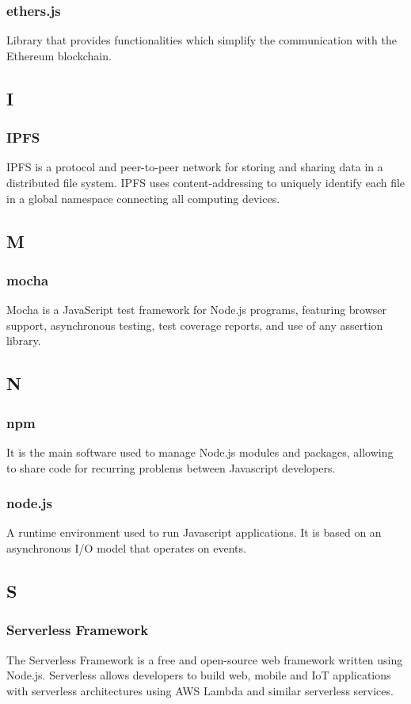 		\subsubsection*{ethers.js}
			Library that provides functionalities which simplify the communication with the Ethereum blockchain.
	
	\subsection{I}
		\subsubsection*{IPFS}
			IPFS is a protocol and peer-to-peer network for storing and sharing data in a distributed file system. IPFS uses content-addressing to uniquely identify each file in a global namespace connecting all computing devices. 
		
	\subsection{M}
		\subsubsection*{mocha}
			Mocha is a JavaScript test framework for Node.js programs, featuring browser support, asynchronous testing, test coverage reports, and use of any assertion library.
	
	\subsection{N}
		\subsubsection*{npm}
			It is the main software used to manage Node.js modules and packages, allowing to share code for recurring problems between Javascript developers.
		\subsubsection*{node.js}
			A runtime environment used to run Javascript applications. It is based on an asynchronous I/O model that operates on events.
	
	\subsection{S}
		\subsubsection*{Serverless Framework}
			The Serverless Framework is a free and open-source web framework written using Node.js. Serverless allows developers to build web, mobile and IoT applications with serverless architectures using AWS Lambda and similar serverless services.
	
